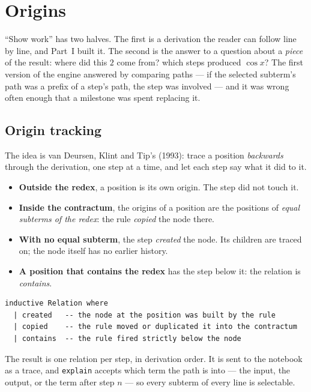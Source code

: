 \chapter{Origins}\label{ch:origins}

``Show work'' has two halves. The first is a derivation the reader can follow line by line, and
Part~I built it. The second is the answer to a question about a \emph{piece} of the result:
where did this $2$ come from? which steps produced $\cos x$? The first version of the engine
answered by comparing paths --- if the selected subterm's path was a prefix of a step's path, the
step was involved --- and it was wrong often enough that a milestone was spent replacing it.

\section{Origin tracking}

The idea is van Deursen, Klint and Tip's (1993): trace a position \emph{backwards} through the
derivation, one step at a time, and let each step say what it did to it.

\begin{itemize}[nosep]
  \item \textbf{Outside the redex}, a position is its own origin. The step did not touch it.
  \item \textbf{Inside the contractum}, the origins of a position are the positions of
    \emph{equal subterms of the redex}: the rule \emph{copied} the node there.
  \item \textbf{With no equal subterm}, the step \emph{created} the node. Its children are traced
    on; the node itself has no earlier history.
  \item \textbf{A position that contains the redex} has the step below it: the relation is
    \emph{contains}.
\end{itemize}

\begin{verbatim}
inductive Relation where
  | created   -- the node at the position was built by the rule
  | copied    -- the rule moved or duplicated it into the contractum
  | contains  -- the rule fired strictly below the node
\end{verbatim}

The result is one relation per step, in derivation order. It is sent to the notebook as a trace,
and \texttt{explain} accepts which term the path is into --- the input, the output, or the term
after step $n$ --- so every subterm of every line is selectable.

